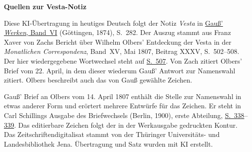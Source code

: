 \clearpage\thispagestyle{empty}
\begin{center}\textbf{Quellen zur Vesta-Notiz}\end{center}
\noindent Diese KI-Übertragung in heutiges Deutsch folgt der Notiz \emph{Vesta} in \href{https://gdz.sub.uni-goettingen.de/id/PPN236007467}{Gauß’ \textit{Werken}, Band~VI} (Göttingen, 1874), S.~282. Der Auszug stammt aus Franz Xaver von Zachs Bericht über Wilhelm Olbers’ Entdeckung der Vesta in der \textit{Monatlichen Correspondenz}, Band~XV, Mai 1807, Beitrag XXXV, S.~502--508. Der hier wiedergegebene Wortwechsel steht auf \href{https://zs.thulb.uni-jena.de/rsc/viewer/jportal_derivate_00237836/Monatliche_Correspondenz_130168688_15_1807_0514.tif}{S.~507}. Von Zach zitiert Olbers’ Brief vom 22. April, in dem dieser wiederum Gauß’ Antwort zur Namenswahl zitiert. Olbers beschreibt auch das von Gauß gewählte Zeichen.
\par\medskip
Gauß’ Brief an Olbers vom 14. April 1807 enthält die Stelle zur Namenswahl in etwas anderer Form und erörtert mehrere Entwürfe für das Zeichen. Er steht in Carl Schillings Ausgabe des Briefwechsels (Berlin, 1900), erste Abteilung, \href{https://archive.org/details/p1wilhelmolberss02olbeuoft/page/n351/mode/1up}{S.~338}--\href{https://archive.org/details/p1wilhelmolberss02olbeuoft/page/n352/mode/1up}{339}. Das editierbare Zeichen folgt der in der Werkausgabe gedruckten Kontur. Das Zeitschriftendigitalisat stammt von der Thüringer Universitäts- und Landesbibliothek Jena. Übertragung und Satz wurden mit KI erstellt.
\clearpage
